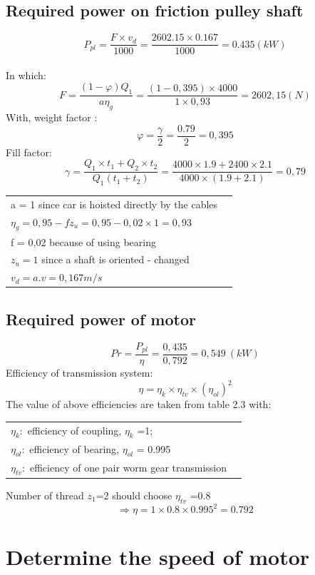 \subsection{Required power on friction pulley shaft}
$$ P_{pl}=\frac{F\times v_d}{1000}=\frac{2602.15\times0.167}{1000}=0.435 (kW)$$\\
In which:\\
$$F = \frac{(1-\varphi)Q_1}{a\eta_g}=\frac{\left(1-0,395\right)\times4000}{1\times0,93}=2602,15 (N)$$
With, weight factor :
$$  \varphi = \frac{\gamma}{2}=\frac{0.79}{2}=0,395 $$ 
Fill factor:
$$\gamma=\frac{Q_1\times t_1+Q_2\times t_2}{Q_1(t_1+t_2)}=\frac{4000\times1.9+2400\times2.1}{4000\times(1.9+2.1)}=0,79  $$

\begin{table}[H]
    \centering
    \begin{tabular}{l l}
    a \; =  1 since car is hoisted directly by the cables\\
	$\eta_g= 0,95 - fz_u = 0,95 - 0,02×1 = 0,93 $\\
	f \;= 0,02 because of using bearing	\\
	$z_u = 1$ since a shaft is oriented - changed\\
    $v_d=a.v=0,167 m/s$\\
    \end{tabular}
\end{table}
\subsection{Required power of motor} 
$$Pr = \frac{P_{pl}}{\eta}=\frac{0,435}{0,792}=0,549\ (kW)$$
Efficiency of transmission system:
$$\eta =\eta_k\times\eta_{tv}\times (\eta_{ol})^2$$
The value of above efficiencies are taken from table 2.3 with:
\begin{table}[H]
    \centering
    \begin{tabular}{l l} 
$\eta_k: $ efficiency of coupling, $\eta_{k}$ =1;\\
$\eta_{ol}: $ efficiency of bearing, $\eta_{ol}$ = 0.995\\
$\eta_{tv}: $ efficiency of one pair worm gear transmission\\
    \end{tabular}
\end{table}
Number of thread $z_1$=2 should choose  $\eta_{tv}$ =0.8
$$\Rightarrow\eta = 1 \times0.8 \times 0.995^2 = 0.792$$
\section{Determine the speed of motor}
